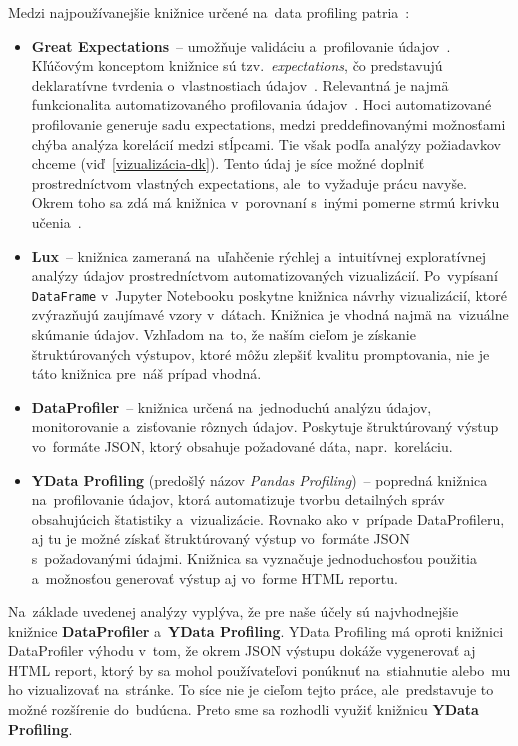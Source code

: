 Medzi najpoužívanejšie knižnice určené na~data profiling patria~\cite{data-profiling-packages}:
\begin{itemize}
\item \textbf{Great Expectations}~-- umožňuje validáciu a~profilovanie údajov~\cite{great-expectations}. Kľúčovým konceptom knižnice sú tzv.~\textit{expectations}, čo predstavujú deklaratívne tvrdenia o~vlastnostiach údajov~\cite{expectations}. Relevantná je najmä funkcionalita automatizovaného profilovania údajov~\cite{automated-data-profiling}. Hoci automatizované profilovanie generuje sadu expectations, medzi preddefinovanými možnosťami chýba analýza korelácií medzi stĺpcami. Tie však podľa analýzy požiadavkov chceme (viď~\ref{vizualizácia-dk}). Tento údaj je síce možné doplniť prostredníctvom vlastných expectations, ale~to vyžaduje prácu navyše. Okrem toho sa zdá má knižnica v~porovnaní s~inými pomerne strmú krivku učenia~\cite{learning-curve}.

\item \textbf{Lux}~-- knižnica zameraná na~uľahčenie rýchlej a~intuitívnej exploratívnej analýzy údajov prostredníctvom automatizovaných vizualizácií. Po~vypísaní \texttt{DataFrame} v~Jupyter Notebooku poskytne knižnica návrhy vizualizácií, ktoré zvýrazňujú zaujímavé vzory v~dátach. Knižnica je vhodná najmä na~vizuálne skúmanie údajov. Vzhľadom na~to, že naším cieľom je získanie štruktúrovaných výstupov, ktoré môžu zlepšiť kvalitu promptovania, nie je táto knižnica pre~náš prípad vhodná.

\item \textbf{DataProfiler}~-- knižnica určená na~jednoduchú analýzu údajov, monitorovanie a~zisťovanie rôznych údajov. Poskytuje štruktúrovaný výstup vo~formáte JSON, ktorý obsahuje požadované dáta, napr.~koreláciu.

\item \textbf{YData Profiling} (predošlý názov \textit{Pandas Profiling})~-- popredná knižnica na~profilovanie údajov, ktorá automatizuje tvorbu detailných správ obsahujúcich štatistiky a~vizualizácie. Rovnako ako v~prípade DataProfileru, aj tu je možné získať štruktúrovaný výstup vo~formáte JSON s~požadovanými údajmi. Knižnica sa vyznačuje jednoduchosťou použitia a~možnosťou generovať výstup aj vo~forme HTML reportu.
\end{itemize}

Na~základe uvedenej analýzy vyplýva, že pre naše účely sú najvhodnejšie knižnice \textbf{DataProfiler} a~\textbf{YData Profiling}. YData Profiling má oproti knižnici DataProfiler výhodu v~tom, že okrem JSON výstupu dokáže vygenerovať aj HTML report, ktorý by sa mohol používateľovi ponúknuť na~stiahnutie alebo~mu ho vizualizovať na~stránke. To síce nie je cieľom tejto práce, ale~predstavuje to možné rozšírenie do~budúcna. Preto sme sa rozhodli využiť knižnicu \textbf{YData Profiling}.

